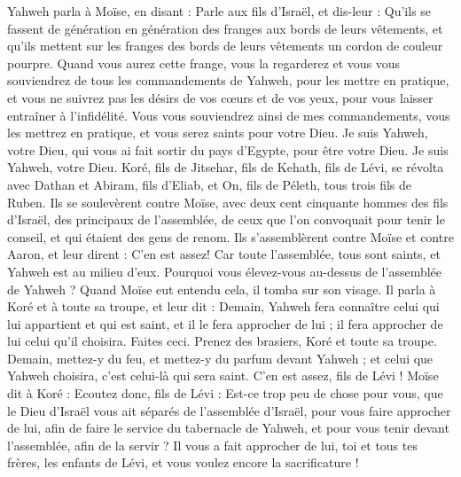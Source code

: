 \begin{multicols}{2}
Yahweh parla à Moïse, en disant :
Parle aux fils d'Israël, et dis-leur : Qu'ils se fassent de génération en génération des franges aux bords de leurs vêtements, et qu'ils mettent sur les franges des bords de leurs vêtements un cordon de couleur pourpre.
Quand vous aurez cette frange, vous la regarderez et vous vous souviendrez de tous les commandements de Yahweh, pour les mettre en pratique, et vous ne suivrez pas les désirs de vos cœurs et de vos yeux, pour vous laisser entraîner à l’infidélité.
Vous vous souviendrez ainsi de mes commandements, vous les mettrez en pratique, et vous serez saints pour votre Dieu.
Je suis Yahweh, votre Dieu, qui vous ai fait sortir du pays d'Egypte, pour être votre Dieu. Je suis Yahweh, votre Dieu.
\VerseOne{}Koré, fils de Jitsehar, fils de Kehath, fils de Lévi, se révolta avec Dathan et Abiram, fils d'Eliab, et On, fils de Péleth, tous trois fils de Ruben.
Ils se soulevèrent contre Moïse, avec deux cent cinquante hommes des fils d'Israël, des principaux de l'assemblée, de ceux que l’on convoquait pour tenir le conseil, et qui étaient des gens de renom.
Ils s'assemblèrent contre Moïse et contre Aaron, et leur dirent : C’en est assez! Car toute l'assemblée, tous sont saints, et Yahweh est au milieu d'eux. Pourquoi vous élevez-vous au-dessus de l'assemblée de Yahweh ?
Quand Moïse eut entendu cela, il tomba sur son visage.
Il parla à Koré et à toute sa troupe, et leur dit : Demain, Yahweh fera connaître celui qui lui appartient et qui est saint, et il le fera approcher de lui ; il fera approcher de lui celui qu'il choisira.
Faites ceci. Prenez des brasiers, Koré et toute sa troupe.
Demain, mettez-y du feu, et mettez-y du parfum devant Yahweh ; et celui que Yahweh choisira, c’est celui-là qui sera saint. C’en est assez, fils de Lévi !
Moïse dit à Koré : Ecoutez donc, fils de Lévi :
Est-ce trop peu de chose pour vous, que le Dieu d’Israël vous ait séparés de l’assemblée d’Israël, pour vous faire approcher de lui, afin de faire le service du tabernacle de Yahweh, et pour vous tenir devant l’assemblée, afin de la servir ?
Il vous a fait approcher de lui, toi et tous tes frères, les enfants de Lévi, et vous voulez encore la sacrificature !

\end{multicols}
